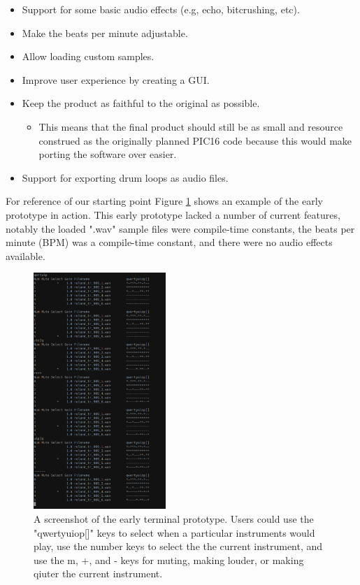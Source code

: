 \documentclass[11pt]{article}
\begin{document}
\begin{itemize}
\item Support for some basic audio effects (e.g, echo, bitcrushing, etc).
\item Make the beats per minute adjustable.
\item Allow loading custom samples.
\item Improve user experience by creating a GUI.
\item Keep the product as faithful to the original as possible.
\begin{itemize}
\item This means that the final product should still be as small and resource construed as the originally planned PIC16 code because this would make porting the software over easier.
\end{itemize}
\item Support for exporting drum loops as audio files.
\end{itemize}


For reference of our starting point Figure \ref{fig:org2bc6f83} shows an example of
the early prototype in action. This early prototype lacked a number of
current features, notably the loaded ".wav" sample files were
compile-time constants, the beats per minute (BPM) was a compile-time
constant, and there were no audio effects available.

\begin{figure}[htbp]
\centering
\includegraphics[width=5cm]{./TUI.png}
\caption{\label{fig:org2bc6f83}
A screenshot of the early terminal prototype. Users could use the "qwertyuiop[]" keys to select when a particular instruments would play, use the number keys to select the the current instrument, and use the m, +, and - keys for muting, making louder, or making qiuter the current instrument.}
\end{figure}
\end{document}
